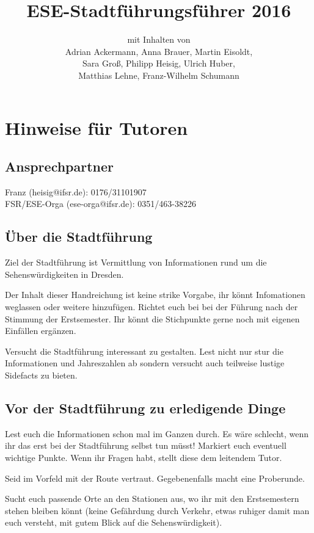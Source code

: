 \documentclass[a4paper,12pt]{report}
\begin{document}
\title{\textbf{ESE-Stadtführungsführer 2016}\\}
\date{}
\author{mit Inhalten von\\Adrian Ackermann, Anna Brauer, Martin Eisoldt,\\Sara Groß, Philipp Heisig, Ulrich Huber,\\ Matthias Lehne, Franz-Wilhelm Schumann}
\maketitle

\chapter{Hinweise für Tutoren}
\section{Ansprechpartner}
Franz (heisig@ifsr.de): 0176/31101907\\
FSR/ESE-Orga (ese-orga@ifsr.de): 0351/463-38226


\section{Über die Stadtführung}
\begin{itemize*}
\item Ziel der Stadtführung ist Vermittlung von Informationen rund um die Sehenswürdigkeiten in Dresden.
\item Der Inhalt dieser Handreichung ist keine strike Vorgabe, ihr könnt Infomationen weglassen oder weitere hinzufügen.
Richtet euch bei bei der Führung nach der Stimmung der Erstsemester.
Ihr könnt die Stichpunkte gerne noch mit eigenen Einfällen ergänzen.
\item Versucht die Stadtführung interessant zu gestalten. Lest nicht nur stur die Informationen und Jahreszahlen ab sondern versucht auch teilweise lustige Sidefacts zu bieten.
\end{itemize*}

\section{Vor der Stadtführung zu erledigende Dinge}
\begin{itemize*}
\item Lest euch die Informationen schon mal im Ganzen durch.
Es wäre schlecht, wenn ihr das erst bei der Stadtführung selbst tun müsst!
Markiert euch eventuell wichtige Punkte.
Wenn ihr Fragen habt, stellt diese dem leitendem Tutor.
\item Seid im Vorfeld mit der Route vertraut. Gegebenenfalls macht eine Proberunde.
\item Sucht euch passende Orte an den Stationen aus, wo ihr mit den Erstsemestern stehen bleiben könnt (keine Gefährdung durch Verkehr, etwas ruhiger damit man euch versteht, mit gutem Blick auf die Sehenswürdigkeit).
\end{itemize*}
\end{document}
